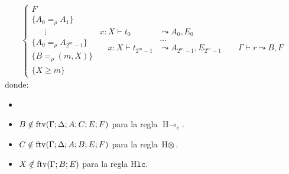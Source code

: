 \begin{definicion}
\[\begin{array}{c}
{\begin{cases}
              F \\
              \{A_0=_\rho A_1\}\\
              \quad\;\;\vdots\\
              \{A_0=_\rho A_{2^m-1}\}\\
              \{B =_\rho (m, X)\}\\
              \{X \geq m\}
          \end{cases}}
     {\begin{aligned}
         x: X\vdash t_0  &\leadsto A_0, E_0 \\
         &\dots\\
         \quad x: X\vdash t_{2^m-1} &\leadsto A_{2^m-1}, E_{2^m-1} \qquad \Gamma \vdash r\leadsto B, F
     \end{aligned}}
   \end{array}
 \]
donde:

\begin{itemize}
    \item
    \item $B \notin \text{ftv}(\Gamma;\Delta;A;C;E;F)$ para la regla $\text{H}\multimap_e$.
    \item $C \notin \text{ftv}(\Gamma;\Delta;A;B;E;F)$ para la regla $\text{H}\otimes$.
    \item $X \notin \text{ftv}(\Gamma;B;E)$ para la regla $\text{H}\mathtt{lc}$.
\end{itemize}

\end{definicion}


